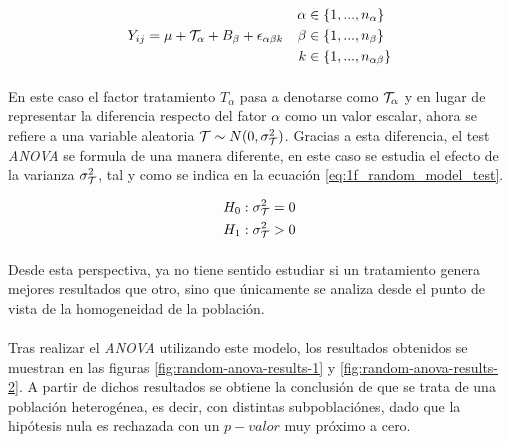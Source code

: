 \documentclass[11pt]{article}
\begin{document}
      \begin{align}
      \label{eq:1f_random_model}
        Y_{ij} = \mu + \mathcal{T}_\alpha + B_\beta + \epsilon_{\alpha \beta k} &&
        \begin{split}
          \alpha &\in \{1,...,n_\alpha \} \\
          \beta &\in \{1, ..., n_\beta \} \\
          k &\in \{1,...,  n_{\alpha\beta} \}
        \end{split}
      \end{align}

      \paragraph{}
      En este caso el factor tratamiento $T_\alpha$ pasa a denotarse como $\mathcal{T}_\alpha$ y en lugar de representar la diferencia respecto del fator $\alpha$ como un valor escalar, ahora se refiere a una variable aleatoria $\mathcal{T} \sim N(0, \sigma_{\mathcal{T}}^2)$. Gracias a esta diferencia, el test \emph{ANOVA} se formula de una manera diferente, en este caso se estudia el efecto de la varianza $\sigma_{\mathcal{T}}^2$, tal y como se indica en la ecuación \eqref{eq:1f_random_model_test}.

      \begin{align}
      \label{eq:1f_random_model_test}
        \begin{split}
          H_0: \sigma^2_{\mathcal{T}} = 0 \\
          H_1: \sigma^2_{\mathcal{T}} > 0
        \end{split}
      \end{align}

      \paragraph{}
      Desde esta perspectiva, ya no tiene sentido estudiar si un tratamiento genera mejores resultados que otro, sino que únicamente se analiza desde el punto de vista de la homogeneidad de la población.

      \paragraph{}
      Tras realizar el \emph{ANOVA} utilizando este modelo, los resultados obtenidos se muestran en las figuras \ref{fig:random-anova-results-1} y \ref{fig:random-anova-results-2}. A partir de dichos resultados se obtiene la conclusión de que se trata de una población heterogénea, es decir, con distintas subpoblaciónes, dado que la hipótesis nula es rechazada con un $p-valor$ muy próximo a cero.
\end{document}
